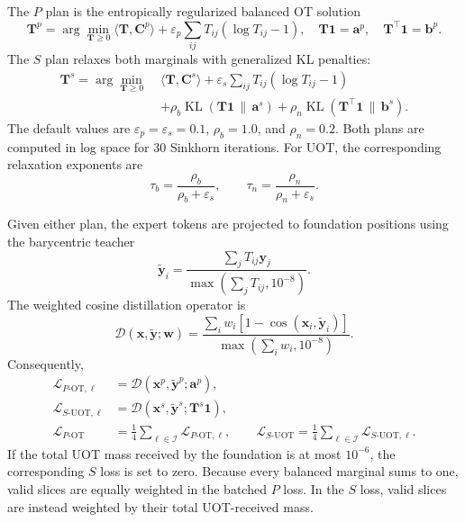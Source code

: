 \documentclass[10pt]{article}
\newcommand{\cL}{\mathcal{L}}
\newcommand{\eps}{\varepsilon}
\newcommand{\KL}{\operatorname{KL}}
\begin{document}
The $P$ plan is the entropically regularized balanced OT solution
\begin{equation}
    \bm{T}^{p}
    =\arg\min_{\bm{T}\geq0}
       \langle\bm{T},\bm{C}^{p}\rangle
       +\eps_p\sum_{ij}T_{ij}(\log T_{ij}-1),
    \quad
    \bm{T}\bm{1}=\bm{a}^{p},\quad
    \bm{T}^{\top}\bm{1}=\bm{b}^{p}.
    \label{eq:balanced-ot}
\end{equation}
The $S$ plan relaxes both marginals with generalized KL penalties:
\begin{equation}
\begin{split}
    \bm{T}^{s}=\arg\min_{\bm{T}\geq0}\;&
       \langle\bm{T},\bm{C}^{s}\rangle
       +\eps_s\sum_{ij}T_{ij}(\log T_{ij}-1)\\
       &+\rho_b\KL(\bm{T}\bm{1}\,\|\,\bm{a}^{s})
       +\rho_n\KL(\bm{T}^{\top}\bm{1}\,\|\,\bm{b}^{s}).
    \label{eq:unbalanced-ot}
\end{split}
\end{equation}
The default values are $\eps_p=\eps_s=0.1$, $\rho_b=1.0$, and $\rho_n=0.2$.
Both plans are computed in log space for 30 Sinkhorn iterations.  For UOT, the
corresponding relaxation exponents are
\begin{equation}
    \tau_b=\frac{\rho_b}{\rho_b+\eps_s},\qquad
    \tau_n=\frac{\rho_n}{\rho_n+\eps_s}.
\end{equation}

Given either plan, the expert tokens are projected to foundation positions using
the barycentric teacher
\begin{equation}
    \widetilde{\bm{y}}_i
    =\frac{\sum_jT_{ij}\bm{y}_j}
           {\max(\sum_jT_{ij},10^{-8})}.
    \label{eq:barycentric-teacher}
\end{equation}
The weighted cosine distillation operator is
\begin{equation}
    \mathcal{D}(\bm{x},\widetilde{\bm{y}};\bm{w})
    =\frac{\sum_iw_i
       \left[1-\cos(\bm{x}_i,\widetilde{\bm{y}}_i)\right]}
       {\max(\sum_iw_i,10^{-8})}.
\end{equation}
Consequently,
\begin{align}
    \cL_{P\text{-OT},\ell}
       &=\mathcal{D}(\bm{x}^{p},\widetilde{\bm{y}}^{p};\bm{a}^{p}),\\
    \cL_{S\text{-UOT},\ell}
       &=\mathcal{D}(\bm{x}^{s},\widetilde{\bm{y}}^{s};
                     \bm{T}^{s}\bm{1}),\\
    \cL_{P\text{-OT}}&=\frac{1}{4}\sum_{\ell\in\mathcal{I}}
       \cL_{P\text{-OT},\ell},\qquad
    \cL_{S\text{-UOT}}=\frac{1}{4}\sum_{\ell\in\mathcal{I}}
       \cL_{S\text{-UOT},\ell}.
    \label{eq:ot-distillation-losses}
\end{align}
If the total UOT mass received by the foundation is at most $10^{-6}$, the
corresponding $S$ loss is set to zero.
Because every balanced marginal sums to one, valid slices are equally weighted
in the batched $P$ loss.  In the $S$ loss, valid slices are instead weighted by
their total UOT-received mass.
\end{document}
